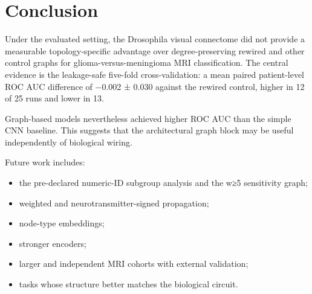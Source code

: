 \section{Conclusion}
\label{sec:08_conclusion}

Under the evaluated setting, the Drosophila visual connectome did not provide a measurable topology-specific advantage over degree-preserving rewired and other control graphs for glioma-versus-meningioma MRI classification. The central evidence is the leakage-safe five-fold cross-validation: a mean paired patient-level ROC AUC difference of −0.002 ± 0.030 against the rewired control, higher in 12 of 25 runs and lower in 13.

Graph-based models nevertheless achieved higher ROC AUC than the simple CNN baseline. This suggests that the architectural graph block may be useful independently of biological wiring.

Future work includes:

\begin{itemize}
\item the pre-declared numeric-ID subgroup analysis and the w≥5 sensitivity graph;
\item weighted and neurotransmitter-signed propagation;
\item node-type embeddings;
\item stronger encoders;
\item larger and independent MRI cohorts with external validation;
\item tasks whose structure better matches the biological circuit.
\end{itemize}
